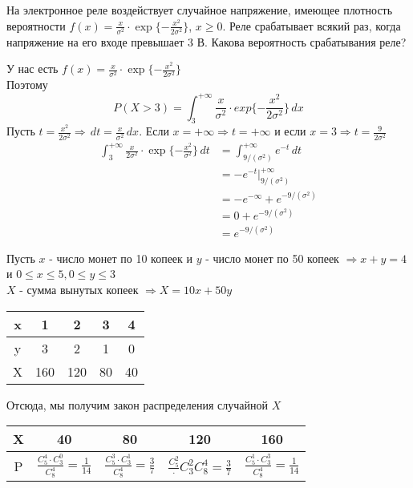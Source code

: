 \begin{exercise}[2] На электронное реле воздействует случайное напряжение, имеющее плотность вероятности $f(x) = \frac{x}{\sigma^2} \cdot \exp\{-\frac{x^2}{2\sigma^2}\}$, $x \geq 0$. Реле срабатывает всякий раз, когда напряжение на его входе превышает 3 В. Какова вероятность срабатывания реле?
	
	У нас есть $f(x) = \frac{x}{\sigma^2} \cdot \exp\{-\frac{x^2}{2\sigma^2}\}$ \\ Поэтому $$P(X > 3) = \int_{3}^{+\infty} \frac{x}{\sigma^2} \cdot exp\{-\frac{x^2}{2\sigma^2}\}\,dx$$
	Пусть $t=\frac{x^2}{2\sigma^2} \Rightarrow \,dt = \frac{x}{\sigma^2} \,dx$. Если $x=+\infty \Rightarrow t = +\infty$ и если $x=3 \Rightarrow t = \frac{9}{2\sigma^2}$
	\begin{align*}
		\int_{3}^{+\infty} \frac{x}{2\sigma^2} \cdot \exp\{-\frac{x^2}{\sigma^2}\} \,dt & = \int_{9/(\sigma^2)}^{+\infty} e^{-t} \,dt \\ & = -e^{-t} |^{+\infty}_{9/(\sigma^2)} \\ & = -e^{-\infty} + e^{-9/(\sigma^2)} \\ & = 0 + e^{-9/(\sigma^2)} \\ & = e^{-9/(\sigma^2)}
	\end{align*}
\end{exercise}

\begin{exercise}[3]
	Пусть $x$ - число монет по 10 копеек и $y$ - число монет по 50 копеек $\Rightarrow x + y = 4$ и $0 \leq x \leq 5, 0 \leq y \leq 3$ \\ $X$ - сумма вынутых копеек $\Rightarrow X = 10x + 50y$
	\begin{center}
		\begin{tabular}{| c  | c | c | c | c |}
			\hline
			x  & 1 & 2 & 3 & 4 \\
			\hline
			y  & 3 & 2 & 1 & 0 \\
			\hline
			X & 160 & 120 & 80 & 40 \\
			\hline
		\end{tabular}
	\end{center} 
	Отсюда, мы получим закон распределения случайной $X$
	\begin{center}
		\begin{tabular}{|c | c | c | c | c |}
			\hline
			X & 40 & 80 & 120 & 160 \\ \hline
			P & $\frac{C^4_5 \cdot C^0_3}{C^4_8} = \frac{1}{14}$ & $\frac{C^3_5 \cdot C^1_3}{C^4_8} = \frac{3}{7}$ & $\frac{C^2_5} \cdot C^2_3{C^4_8} = \frac{3}{7}$ & $\frac{C^1_5 \cdot C^3_3}{C^4_8} = \frac{1}{14}$ \\ \hline
		\end{tabular}
	\end{center}
\end{exercise}

